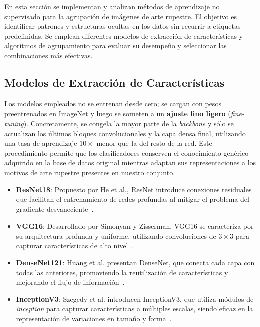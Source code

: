 En esta sección se implementan y analizan métodos de aprendizaje no supervisado para la agrupación de imágenes de arte rupestre.
El objetivo es identificar patrones y estructuras ocultas en los datos sin recurrir a etiquetas predefinidas.
Se emplean diferentes modelos de extracción de características y algoritmos de agrupamiento para evaluar su desempeño y seleccionar las combinaciones más efectivas.

\subsection{Modelos de Extracción de Características}

Los modelos empleados no se entrenan desde cero; se cargan con pesos preentrenados en ImageNet y luego se someten a un \textbf{ajuste fino ligero} (\emph{fine-tuning}).
Concretamente, se congela la mayor parte de la \emph{backbone} y sólo se actualizan los últimos bloques convolucionales y la capa densa final, utilizando una tasa de aprendizaje \(10\times\) menor que la del resto de la red.
Este procedimiento permite que los clasificadores conserven el conocimiento genérico adquirido en la base de datos original mientras adaptan sus representaciones a los motivos de arte rupestre presentes en nuestro conjunto.

\begin{itemize}
    \item \textbf{ResNet18}: Propuesto por He et al., ResNet introduce conexiones residuales que facilitan el entrenamiento de redes profundas al mitigar el problema del gradiente desvaneciente~\cite{he2016deep}.
    \item \textbf{VGG16}: Desarrollado por Simonyan y Zisserman, VGG16 se caracteriza por su arquitectura profunda y uniforme, utilizando convoluciones de \(3 \times 3\) para capturar características de alto nivel~\cite{simonyan2014very}.
    \item \textbf{DenseNet121}: Huang et al. presentan DenseNet, que conecta cada capa con todas las anteriores, promoviendo la reutilización de características y mejorando el flujo de información~\cite{huang2017densely}.
    \item \textbf{InceptionV3}: Szegedy et al. introducen InceptionV3, que utiliza módulos de \emph{inception} para capturar características a múltiples escalas, siendo eficaz en la representación de variaciones en tamaño y forma~\cite{szegedy2016rethinking}.
\end{itemize}

